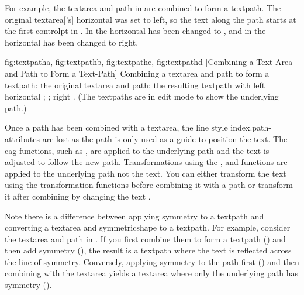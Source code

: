 For example, the \gls{textarea} and \gls{path} in
 are combined to form a \gls*{textpath}.
The original \gls*{textarea}['s] horizontal  was
set to left, so the text along the path starts at the first
\gls{controlpt} in . In
 the horizontal  has been
changed to , and in  the
horizontal  has been changed to right.

{
 {fig:textpatha}{}{},
 {fig:textpathb}{}{},
 {fig:textpathc}{}{},
 {fig:textpathd}{}{}
}
[Combining a Text Area and Path to Form a Text-Path]
{Combining a \gls{textarea} and \gls{path} to form a \gls{textpath}:
 the original \gls{textarea} and \gls{path};
 the resulting \gls{textpath} with left horizontal 
; 
  ; 
 right . 
(The \glspl{textpath} are in edit mode to show the underlying path.)}

Once a \gls{path} has been combined with a \gls{textarea}, the line
style \glspl{index.path-attribute} are lost as the path is only used
as a guide to position the text. The \gls{cag} functions, such as
, are applied to the underlying path and the text
is adjusted to follow the new path.  Transformations using the
,  and 
functions are applied to the underlying path not the text. You can
either transform the text using the transformation functions before
combining it with a path or transform it after combining by changing
the text .

Note there is a difference between applying \gls{symmetry} to a
\gls{textpath} and converting a \gls*{textarea} and
\gls{symmetricshape} to a \gls*{textpath}. For example, consider the
\gls{textarea} and \gls{path} in . If
you first combine them to form a \gls*{textpath}
() and then add symmetry
(), the result is a \gls*{textpath}
where the text is reflected across the \gls{line-of-symmetry}.
Conversely, applying \gls{symmetry} to the path first
() and then combining with the
\gls*{textarea} yields a \gls*{textarea} where only the underlying
path has \gls{symmetry} ().

